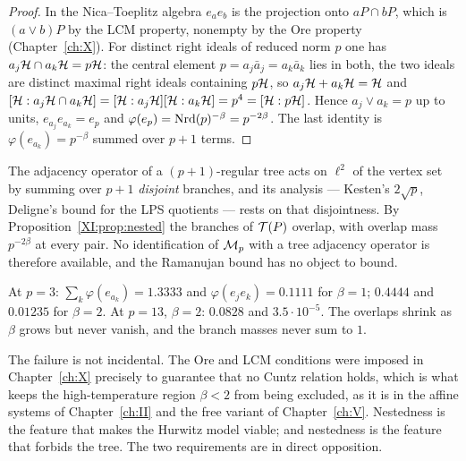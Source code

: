 \begin{proof}
In the Nica--Toeplitz algebra $e_ae_b$ is the projection onto $aP\cap bP$, which is
$(a\vee b)P$ by the LCM property, nonempty by the Ore property (Chapter~\ref{ch:X}). For distinct right
ideals of reduced norm $p$ one has $a_j\mathcal{H}\cap a_k\mathcal{H}=p\mathcal{H}$: the central element
$p=a_j\bar a_j=a_k\bar a_k$ lies in both, the two ideals are distinct maximal right ideals
containing $p\mathcal{H}$, so $a_j\mathcal{H}+a_k\mathcal{H}=\mathcal{H}$ and $[\mathcal{H}:a_j\mathcal{H}\cap a_k\mathcal{H}]=[\mathcal{H}:a_j\mathcal{H}][\mathcal{H}:a_k\mathcal{H}]=p^4=[\mathcal{H}:p\mathcal{H}]$.
Hence $a_j\vee a_k=p$ up to units, $e_{a_j}e_{a_k}=e_p$ and $\varphi(e_p)=\operatorname{Nrd}(p)^{-\beta}=p^{-2\beta}$.
The last identity is $\varphi(e_{a_k})=p^{-\beta}$ summed over $p+1$ terms.
\end{proof}

\begin{corollary}\label{XI:cor:notree}
The adjacency operator of a $(p+1)$-regular tree acts on $\ell^2$ of the vertex set by summing
over $p+1$ \emph{disjoint} branches, and its analysis --- Kesten's $2\sqrt p$, Deligne's
bound for the LPS quotients --- rests on that disjointness. By
Proposition~\ref{XI:prop:nested} the branches of $\mathcal{T}(P)$ overlap, with overlap mass
$p^{-2\beta}$ at every pair. No identification of $\mathcal{M}_p$ with a tree adjacency operator is
therefore available, and the Ramanujan bound has no object to bound.
\end{corollary}

\begin{remark}\label{XI:rem:num1}
At $p=3$: $\sum_k\varphi(e_{a_k})=1.3333$ and $\varphi(e_je_k)=0.1111$ for $\beta=1$;
$0.4444$ and $0.01235$ for $\beta=2$. At $p=13$, $\beta=2$: $0.0828$ and $3.5\cdot10^{-5}$.
The overlaps shrink as $\beta$ grows but never vanish, and the branch masses never sum to $1$.
\end{remark}

\begin{remark}\label{XI:rem:tension}
The failure is not incidental. The Ore and LCM conditions were imposed in Chapter~\ref{ch:X} precisely
to guarantee that no Cuntz relation holds, which is what keeps the high-temperature region
$\beta<2$ from being excluded, as it is in the affine systems of Chapter~\ref{ch:II} and the free
variant of Chapter~\ref{ch:V}. Nestedness is the feature that makes the Hurwitz model viable; and
nestedness is the feature that forbids the tree. The two requirements are in direct
opposition.
\end{remark}

